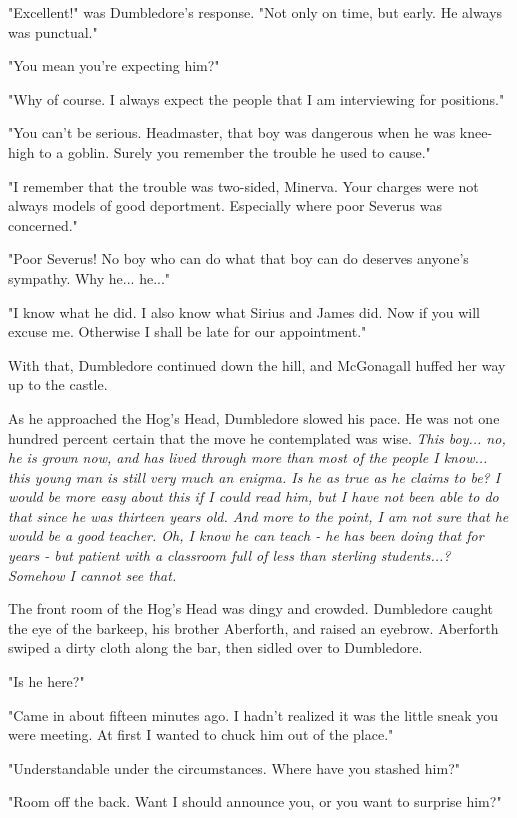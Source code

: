 \documentclass[a4paper,11pt]{article}
\begin{document}
"Excellent!" was Dumbledore's response. "Not only on time, but early. He always was punctual."

"You mean you're expecting him?"

"Why of course. I always expect the people that I am interviewing for positions."

"You can't be serious. Headmaster, that boy was dangerous when he was knee-high to a goblin. Surely you remember the trouble he used to cause."

"I remember that the trouble was two-sided, Minerva. Your charges were not always models of good deportment. Especially where poor Severus was concerned."

"Poor Severus! No boy who can do what that boy can do deserves anyone's sympathy. Why he... he..."

"I know what he did. I also know what Sirius and James did. Now if you will excuse me. Otherwise I shall be late for our appointment."

With that, Dumbledore continued down the hill, and McGonagall huffed her way up to the castle.

As he approached the Hog's Head, Dumbledore slowed his pace. He was not one hundred percent certain that the move he contemplated was wise. \emph{This boy... no, he is grown now, and has lived through more than most of the people I know... this young man is still very much an enigma. Is he as true as he claims to be? I would be more easy about this if I could read him, but I have not been able to do that since he was thirteen years old. And more to the point, I am not sure that he would be a good teacher. Oh, I know he can teach - he has been doing that for years - but patient with a classroom full of less than sterling students...? Somehow I cannot see that.}

The front room of the Hog's Head was dingy and crowded. Dumbledore caught the eye of the barkeep, his brother Aberforth, and raised an eyebrow. Aberforth swiped a dirty cloth along the bar, then sidled over to Dumbledore.

"Is he here?"

"Came in about fifteen minutes ago. I hadn't realized it was the little sneak you were meeting. At first I wanted to chuck him out of the place."

"Understandable under the circumstances. Where have you stashed him?"

"Room off the back. Want I should announce you, or you want to surprise him?"
\end{document}
